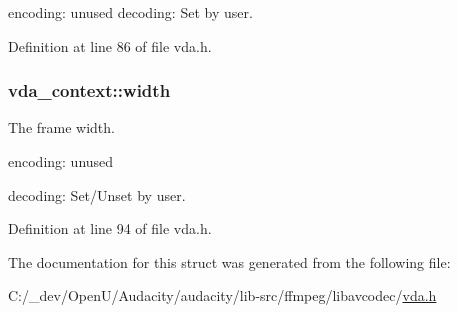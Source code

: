 encoding\+: unused decoding\+: Set by user. 

Definition at line 86 of file vda.\+h.

\subsubsection[{\texorpdfstring{width}{width}}]{ vda\+\_\+context\+::width}\hypertarget{structvda__context_a1f8c3055063a3492f0066766930fbce9}{}\label{structvda__context_a1f8c3055063a3492f0066766930fbce9}
The frame width.


\begin{DoxyItemize}
\item encoding\+: unused
\item decoding\+: Set/\+Unset by user. 
\end{DoxyItemize}

Definition at line 94 of file vda.\+h.



The documentation for this struct was generated from the following file\+:\begin{DoxyCompactItemize}
\item 
C\+:/\+\_\+dev/\+Open\+U/\+Audacity/audacity/lib-\/src/ffmpeg/libavcodec/\hyperlink{vda_8h}{vda.\+h}\end{DoxyCompactItemize}
